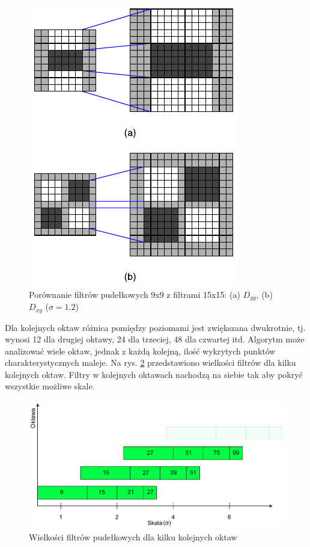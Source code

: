 \begin{figure}[h]
	\centering
	\includegraphics[scale=1.5]{graphics/01_podstawy_teoretyczne/surf-9-to-15.pdf}
	\caption{Porównanie filtrów pudełkowych 9x9 z filtrami 15x15: (a) $D_{yy}$, (b) $D_{xy}$ ($\sigma = 1.2$) \cite{BAY08}}
	\label{fig:surf-9-to-15}
\end{figure}

Dla kolejnych oktaw różnica pomiędzy poziomami jest zwiększana dwukrotnie, tj. wynosi 12 dla drugiej oktawy, 24 dla trzeciej, 48 dla czwartej itd. Algorytm może analizować wiele oktaw, jednak z każdą kolejną, ilość wykrytych punktów charakterystycznych maleje. Na rys. \ref{fig:surf-octaves} przedstawiono wielkości filtrów dla kilku kolejnych oktaw. Filtry w kolejnych oktawach nachodzą na siebie tak aby pokryć wszystkie możliwe skale.

\begin{figure}[h]
	\centering
	\includegraphics[scale=0.7]{graphics/01_podstawy_teoretyczne/surf-octaves.pdf}
	\caption{Wielkości filtrów pudełkowych dla kilku kolejnych oktaw \cite{BAY08}}
	\label{fig:surf-octaves}
\end{figure}

